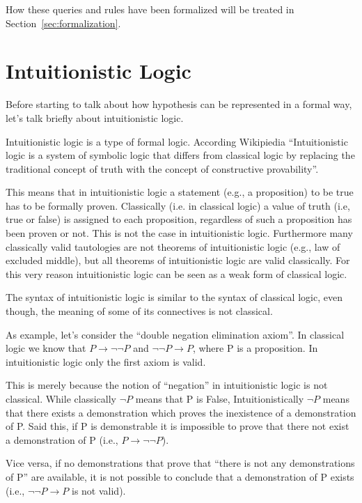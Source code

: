 How these queries and rules have been formalized will be treated in
Section~\ref{sec:formalization}.

\section{Intuitionistic Logic}
\label{sec:il}
Before starting to talk about how hypothesis can be represented in a formal way,
let's talk briefly about intuitionistic logic.

Intuitionistic logic is a type of formal logic.
According Wikipiedia ``Intuitionistic logic is a system of symbolic logic that
differs from classical logic by replacing the traditional concept of truth with
the concept of constructive provability''.

This means that in intuitionistic logic a statement (e.g., a proposition) to be true
has to be formally proven.
Classically (i.e. in classical logic) a value of truth (i.e,
true or false) is assigned to each proposition, regardless of such a proposition
has been proven or not. This is not the case in intuitionistic logic. Furthermore
many classically valid tautologies are not theorems of intuitionistic logic (e.g.,
law of excluded middle), but all theorems of intuitionistic logic are valid classically. 
For this very reason intuitionistic logic can be seen as a weak form of classical logic.

The syntax of intuitionistic logic is similar to the syntax of classical logic,
even though, the meaning of some of its connectives is not classical.

As example, let's consider the ``double negation elimination axiom''.
In classical logic we know that $P \to \lnot\lnot P$ and $\lnot\lnot P \to  P$, where P
is a proposition. In intuitionistic logic only the first axiom is valid.

This is merely because the notion of ``negation'' in intuitionistic logic is not classical.
While classically $\lnot P$ means that P is False, Intuitionistically $\lnot P$ means that 
there exists a demonstration which proves the inexistence of a demonstration of P. 
Said this, if P is demonstrable it is impossible
to prove that there not exist a demonstration of P (i.e.,  $P \to \lnot\lnot P$).

Vice versa, if no demonstrations that prove that ``there is not any demonstrations of P'' are available,
it is not possible to conclude that a demonstration of P exists (i.e., $\lnot\lnot P \to  P$ is not
valid).


